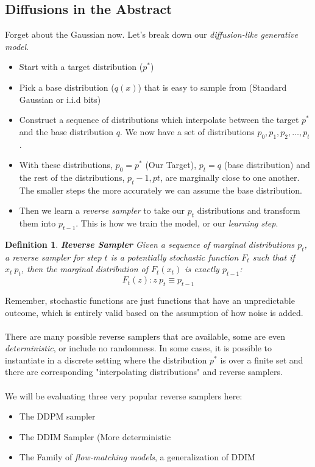 \documentclass[10pt, oneside]{report}
\newtheorem{defn}{Definition}
\begin{document}
\subsection{Diffusions in the Abstract}
Forget about the Gaussian now. Let's break down our \textit{diffusion-like generative model}. 
\begin{itemize}
    \item Start with a target distribution ($p^*$)
    \item Pick a base distribution ($q(x)$) that is easy to sample from (Standard Gaussian or i.i.d bits)
    \item Construct a sequence of distributions which interpolate between the target $p^*$ and the base distribution $q$.  We now have a set of distributions $p_0, p_1, p_2, \ldots, p_t$. 
    \item With these distributions, $p_0 = p^*$ (Our Target), $p_t = q$ (base distribution) and the rest of the distributions, $p_t-1, pt$, are marginally close to one another.  The smaller steps the more accurately we can assume the base distribution.
    \item Then we learn a \textit{reverse sampler} to take our $p_t$ distributions and transform them into $p_{t-1}$.  This is how we train the model, or our \textit{learning step}.
\end{itemize}

\begin{defn}
    \textbf{Reverse Sampler} Given a sequence of marginal distributions $p_t$, a reverse sampler for step $t$ is a potentially stochastic function $F_t$ such that if $x_t ~ p_t$, then the marginal distribution of $F_t(x_t)$ is exactly $p_{t-1}$:
    \[
        {F_t(z) : z ~ p_t} \equiv p_{t-1}
    \] 
\end{defn}

Remember, stochastic functions are just functions that have an unpredictable outcome, which is entirely valid based on the assumption of how noise is added.
\\
\\
There are many possible reverse samplers that are available, some are even \textit{deterministic}, or include no randomness. In some cases, it is possible to instantiate in a discrete setting where the distribution $p^*$ is over a finite set and there are corresponding "interpolating distributions" and reverse samplers. 
\\
\\
We will be evaluating three very popular reverse samplers here:
\begin{itemize}
    \item The DDPM sampler
    \item The DDIM Sampler (More deterministic
    \item The Family of \textit{flow-matching models}, a generalization of DDIM
\end{itemize}
\end{document}
